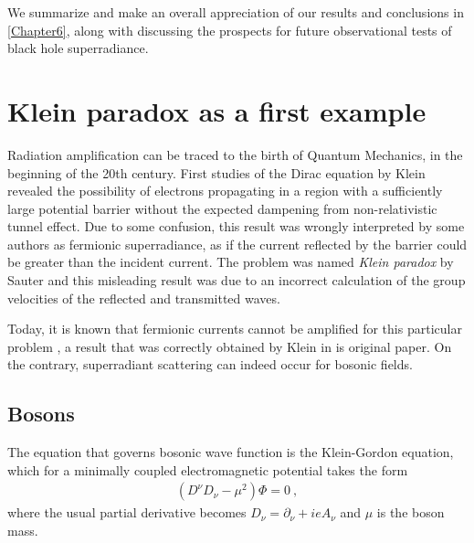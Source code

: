 We summarize and make an overall appreciation of our results and conclusions in \cref{Chapter6}, along with discussing the prospects for future observational tests of black hole superradiance.



\section{Klein paradox as a first example}

Radiation amplification can be traced to the birth of Quantum Mechanics, in the beginning of the 20th century. 
First studies of the Dirac equation by Klein \cite{Klein1929} revealed the possibility of electrons propagating in a region with a sufficiently large potential barrier without the expected dampening from non-relativistic tunnel effect.
Due to some confusion, this result was wrongly interpreted by some authors as fermionic superradiance, as if the current reflected by the barrier could be greater than the incident current. 
The problem was named \emph{Klein paradox} by Sauter \cite{Sauter1931} and this misleading result was due to an incorrect calculation of the group velocities of the reflected and transmitted waves. 

Today, it is known that fermionic currents cannot be amplified for this particular problem \cite{Manogue1988,Klein1929}, a result that was correctly obtained by Klein in is original paper. 
On the contrary, superradiant scattering can indeed occur for bosonic fields.

\subsection{Bosons}

The equation that governs bosonic wave function is the Klein-Gordon equation, which for a minimally coupled electromagnetic potential takes the form
\begin{align}
    (D^\nu D_\nu - \mu^2) \Phi = 0 ~,
    \label{eq1:KleinGordon}
\end{align}
where the usual partial derivative becomes $D_\nu = \partial_\nu + i e A_\nu$ and $\mu$ is the boson mass.

